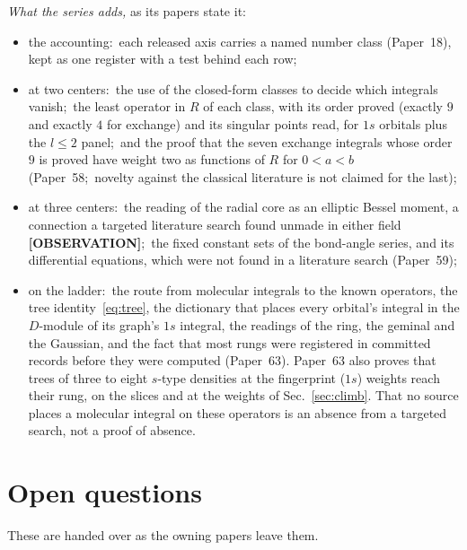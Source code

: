 \documentclass[aps,pra,twocolumn,superscriptaddress,longbibliography]{revtex4-2}
\begin{document}
\emph{What the series adds,} as its papers state it:
\begin{itemize}
\item the accounting:\ each released axis carries a named number class
(Paper~18), kept as one register with a test behind each row;
\item at two centers:\ the use of the closed-form classes to decide
which integrals vanish;\ the least operator in $R$ of each class, with its order
proved (exactly $9$ and exactly $4$ for exchange) and its singular points
read, for $1s$ orbitals plus the $l\le2$ panel;\ and the proof that the
seven exchange integrals whose order $9$ is proved have weight two as
functions of $R$ for $0<a<b$ (Paper~58;\ novelty against the classical
literature is not claimed for the last);
\item at three centers:\ the reading of the radial core as an elliptic
Bessel moment, a connection a targeted literature search found unmade in
either field \textbf{[OBSERVATION]};\ the fixed constant sets of the
bond-angle series, and its differential equations, which were not found
in a literature search (Paper~59);
\item on the ladder:\ the route from molecular integrals to the known
operators, the tree identity~\eqref{eq:tree}, the dictionary that places every orbital's integral in the $D$-module of
its graph's $1s$ integral, the readings of the ring, the geminal and the
Gaussian, and the fact that most rungs were registered in committed
records before they were computed (Paper~63).  Paper~63 also proves that
trees of three to eight $s$-type densities at the fingerprint ($1s$) weights reach their rung, on the slices
and at the weights of Sec.~\ref{sec:climb}.  That no source places a molecular integral on
these operators is an absence from a targeted search, not a proof of
absence.
\end{itemize}

\section{Open questions}
\label{sec:open}

These are handed over as the owning papers leave them.
\end{document}
